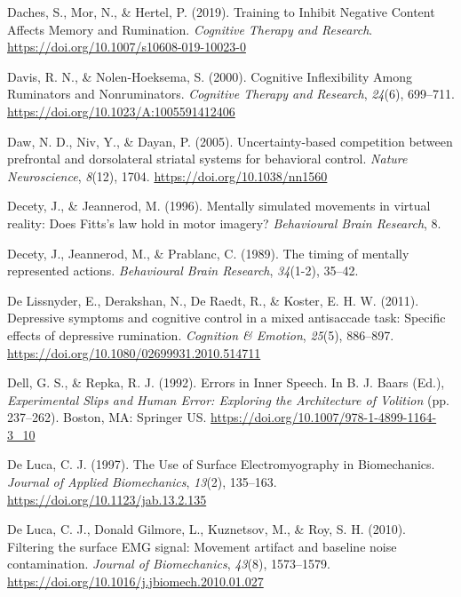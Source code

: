\documentclass[a4paper,12pt,twoside,onecolumn,openright,final,oldfontcommands]{memoir}
\begin{document}
\leavevmode\hypertarget{ref-daches_training_2019}{}%
Daches, S., Mor, N., \& Hertel, P. (2019). Training to Inhibit Negative Content Affects Memory and Rumination. \emph{Cognitive Therapy and Research}. \url{https://doi.org/10.1007/s10608-019-10023-0}

\leavevmode\hypertarget{ref-Davis2000}{}%
Davis, R. N., \& Nolen-Hoeksema, S. (2000). Cognitive Inflexibility Among Ruminators and Nonruminators. \emph{Cognitive Therapy and Research}, \emph{24}(6), 699--711. \url{https://doi.org/10.1023/A:1005591412406}

\leavevmode\hypertarget{ref-daw_uncertainty-based_2005}{}%
Daw, N. D., Niv, Y., \& Dayan, P. (2005). Uncertainty-based competition between prefrontal and dorsolateral striatal systems for behavioral control. \emph{Nature Neuroscience}, \emph{8}(12), 1704. \url{https://doi.org/10.1038/nn1560}

\leavevmode\hypertarget{ref-decety_mentally_1996}{}%
Decety, J., \& Jeannerod, M. (1996). Mentally simulated movements in virtual reality: Does Fitts's law hold in motor imagery? \emph{Behavioural Brain Research}, 8.

\leavevmode\hypertarget{ref-decety_timing_1989}{}%
Decety, J., Jeannerod, M., \& Prablanc, C. (1989). The timing of mentally represented actions. \emph{Behavioural Brain Research}, \emph{34}(1-2), 35--42.

\leavevmode\hypertarget{ref-DeLissnyder2011}{}%
De Lissnyder, E., Derakshan, N., De Raedt, R., \& Koster, E. H. W. (2011). Depressive symptoms and cognitive control in a mixed antisaccade task: Specific effects of depressive rumination. \emph{Cognition \& Emotion}, \emph{25}(5), 886--897. \url{https://doi.org/10.1080/02699931.2010.514711}

\leavevmode\hypertarget{ref-dell_errors_1992}{}%
Dell, G. S., \& Repka, R. J. (1992). Errors in Inner Speech. In B. J. Baars (Ed.), \emph{Experimental Slips and Human Error: Exploring the Architecture of Volition} (pp. 237--262). Boston, MA: Springer US. \url{https://doi.org/10.1007/978-1-4899-1164-3_10}

\leavevmode\hypertarget{ref-de_luca_use_1997}{}%
De Luca, C. J. (1997). The Use of Surface Electromyography in Biomechanics. \emph{Journal of Applied Biomechanics}, \emph{13}(2), 135--163. \url{https://doi.org/10.1123/jab.13.2.135}

\leavevmode\hypertarget{ref-de_luca_filtering_2010}{}%
De Luca, C. J., Donald Gilmore, L., Kuznetsov, M., \& Roy, S. H. (2010). Filtering the surface EMG signal: Movement artifact and baseline noise contamination. \emph{Journal of Biomechanics}, \emph{43}(8), 1573--1579. \url{https://doi.org/10.1016/j.jbiomech.2010.01.027}
\end{document}

